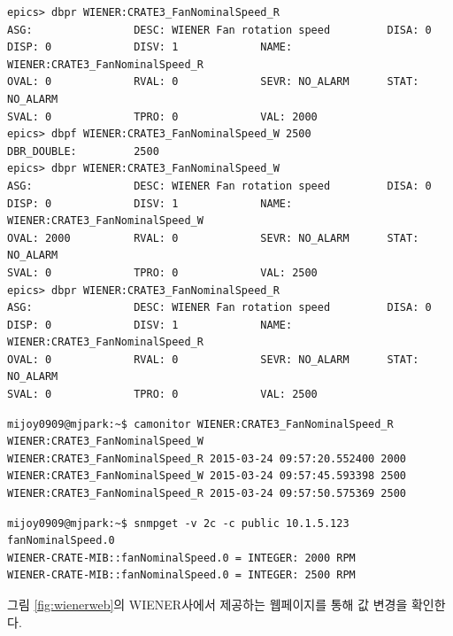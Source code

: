 \documentclass[11pt
  , a4paper
  , article
  , oneside
]{memoir}
\begin{document}
\begin{lstlisting}[style=termstyle]
epics> dbpr WIENER:CRATE3_FanNominalSpeed_R
ASG:                DESC: WIENER Fan rotation speed         DISA: 0             
DISP: 0             DISV: 1             NAME: WIENER:CRATE3_FanNominalSpeed_R   
OVAL: 0             RVAL: 0             SEVR: NO_ALARM      STAT: NO_ALARM      
SVAL: 0             TPRO: 0             VAL: 2000           
epics> dbpf WIENER:CRATE3_FanNominalSpeed_W 2500
DBR_DOUBLE:         2500      
epics> dbpr WIENER:CRATE3_FanNominalSpeed_W
ASG:                DESC: WIENER Fan rotation speed         DISA: 0             
DISP: 0             DISV: 1             NAME: WIENER:CRATE3_FanNominalSpeed_W   
OVAL: 2000          RVAL: 0             SEVR: NO_ALARM      STAT: NO_ALARM      
SVAL: 0             TPRO: 0             VAL: 2500      
epics> dbpr WIENER:CRATE3_FanNominalSpeed_R
ASG:                DESC: WIENER Fan rotation speed         DISA: 0             
DISP: 0             DISV: 1             NAME: WIENER:CRATE3_FanNominalSpeed_R   
OVAL: 0             RVAL: 0             SEVR: NO_ALARM      STAT: NO_ALARM      
SVAL: 0             TPRO: 0             VAL: 2500     
\end{lstlisting}

\begin{lstlisting}[style=termstyle]
mijoy0909@mjpark:~$ camonitor WIENER:CRATE3_FanNominalSpeed_R WIENER:CRATE3_FanNominalSpeed_W
WIENER:CRATE3_FanNominalSpeed_R 2015-03-24 09:57:20.552400 2000  
WIENER:CRATE3_FanNominalSpeed_W 2015-03-24 09:57:45.593398 2500  
WIENER:CRATE3_FanNominalSpeed_R 2015-03-24 09:57:50.575369 2500  
\end{lstlisting}

\begin{lstlisting}[style=termstyle]
mijoy0909@mjpark:~$ snmpget -v 2c -c public 10.1.5.123 fanNominalSpeed.0
WIENER-CRATE-MIB::fanNominalSpeed.0 = INTEGER: 2000 RPM
WIENER-CRATE-MIB::fanNominalSpeed.0 = INTEGER: 2500 RPM
\end{lstlisting}

그림 \ref{fig:wienerweb}의 WIENER사에서 제공하는 웹페이지를 통해 값 변경을 확인한다.
\end{document}
